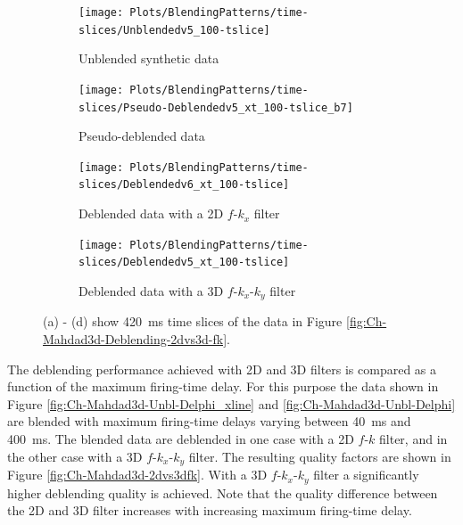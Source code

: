 \begin{figure}
	
	\centering
	\begin{subfigure}[t]{0.45\textwidth}
		\centering
		\texttt{[image: Plots/BlendingPatterns/time-slices/Unblendedv5\_100-tslice]}
		\caption{Unblended synthetic data}
		\label{fig:Ch-Mahdad3d-Unbl-Delphi-tslice}
	\end{subfigure}
	\centering
	\begin{subfigure}[t]{0.45\textwidth}
		\texttt{[image: Plots/BlendingPatterns/time-slices/Pseudo-Deblendedv5\_xt\_100-tslice\_b7]}
		\caption{Pseudo-deblended data}
		\label{fig:Ch-Mahdad3d-Deblending-Pseudo-Zoom-tslice}
	\end{subfigure}
	
	\par\bigskip

	\centering
	\begin{subfigure}[t]{0.45\textwidth}
		\texttt{[image: Plots/BlendingPatterns/time-slices/Deblendedv6\_xt\_100-tslice]}
		\caption{Deblended data with a 2D $f$-$k_x$ filter}
		\label{fig:Ch-Mahdad3d-Deblending-2dfk-tslice}
	\end{subfigure}
	\centering
	\begin{subfigure}[t]{0.45\textwidth}
		\texttt{[image: Plots/BlendingPatterns/time-slices/Deblendedv5\_xt\_100-tslice]}
		\caption{Deblended data with a 3D $f$-$k_x$-$k_y$ filter}
		\label{fig:Ch-Mahdad3d-Deblending-3dfk-tslice}
	\end{subfigure}
	
	\caption{(a) - (d) show \SI{420}{\milli\second} time slices of the data in Figure \ref{fig:Ch-Mahdad3d-Deblending-2dvs3d-fk}.}
	\label{fig:Ch-Mahdad3d-Deblending-2dvs3d-fk-tslice}
	
\end{figure}


The deblending performance achieved with 2D and 3D filters is compared as a function of the maximum firing-time delay. For this purpose the data shown in Figure \ref{fig:Ch-Mahdad3d-Unbl-Delphi_xline} and \ref{fig:Ch-Mahdad3d-Unbl-Delphi} are blended with maximum firing-time delays varying between \SI{40}{\milli\second} and \SI{400}{\milli\second}. The blended data are deblended in one case with a 2D $f$-$k$ filter, and in the other case with a 3D $f$-$k_x$-$k_y$ filter. The resulting quality factors are shown in Figure \ref{fig:Ch-Mahdad3d-2dvs3dfk}. With a 3D $f$-$k_x$-$k_y$ filter a significantly higher deblending quality is achieved. Note that the quality difference between the 2D and 3D filter increases with increasing maximum firing-time delay. 



